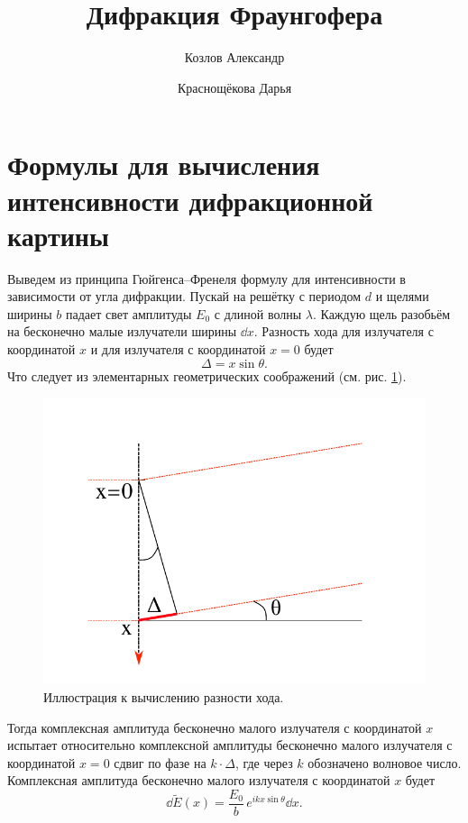 \documentclass[12pt]{article}
\title{Дифракция Фраунгофера}
\author{Козлов Александр \and Краснощёкова Дарья}
\begin{document}
	\maketitle
	\section{Формулы для вычисления интенсивности дифракционной картины}
	Выведем из принципа Гюйгенса\---Френеля формулу для интенсивности в зависимости от угла дифракции. Пускай на решётку с периодом $d$ и щелями ширины $b$ падает свет амплитуды $E_0$ с длиной волны $\lambda$. Каждую щель разобьём на бесконечно малые излучатели ширины $\dd x$. Разность хода для излучателя с координатой $x$ и для излучателя с координатой $x=0$ будет
	\begin{equation}
		\Delta = x \sin{\theta}.
	\end{equation}
	Что следует из элементарных геометрических соображений (см. рис. \ref{fig:figure1}).
	\begin{figure}[ht]
		\centering
		\includegraphics[width=\linewidth]{../images/fig1}
		\caption{Иллюстрация к вычислению разности хода.}
		\label{fig:figure1}
	\end{figure}
	Тогда комплексная амплитуда бесконечно малого излучателя с координатой $x$ испытает относительно комплексной амплитуды бесконечно малого излучателя с координатой $x=0$ сдвиг по фазе на $k\cdot\Delta$, где через $k$ обозначено волновое число. Комплексная амплитуда бесконечно малого излучателя с координатой $x$ будет
	\begin{equation}
	 	\dd \tilde{E}(x) = \dfrac{E_0}{b}\, e^{i k x \sin{\theta}}\dd x.
	\end{equation}
\end{document}
